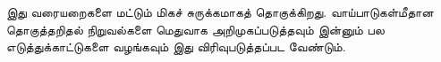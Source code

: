 \documentclass[../../../include/open-logic-chapter]{subfiles}
\begin{document}

\begin{editorial}
  இது வரையறைகளை மட்டும் மிகச் சுருக்கமாகத் தொகுக்கிறது. வாய்பாடுகள்மீதான
  தொகுத்தறிதல் நிறுவல்களை மெதுவாக அறிமுகப்படுத்தவும் இன்னும் பல
  எடுத்துக்காட்டுகளை வழங்கவும் இது விரிவுபடுத்தப்பட வேண்டும்.
\end{editorial}







\OLEndChapterHook
\end{document}
